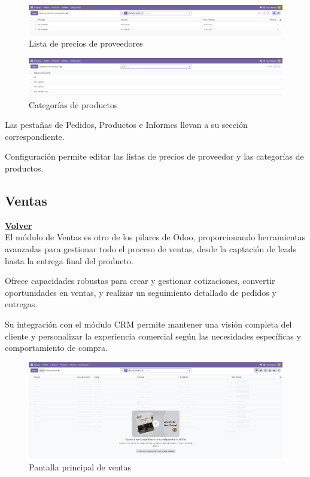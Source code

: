 \documentclass[a4paper,12pt]{article}
\begin{document}
\begin{figure}[h!]
    \centering
    \includegraphics[width=1\textwidth]{pr2odoo38-preciosProveedor.png}
    \caption{Lista de precios de proveedores}
\end{figure}
\FloatBarrier

\begin{figure}[h!]
    \centering
    \includegraphics[width=1\textwidth]{pr2odoo39-categoriasPrioductos.png}
    \caption{Categorías de productos}
\end{figure}
\FloatBarrier

Las pestañas de Pedidos, Productos e Informes llevan a su sección correspondiente.

Configuración permite editar las listas de precios de proveedor y las categorías de productos.

\clearpage

\subsection{Ventas}
\hyperlink{anchor-indice}{\textbf{Volver}}\\

El módulo de Ventas es otro de los pilares de Odoo, proporcionando herramientas avanzadas para gestionar todo el proceso de ventas, desde la captación de leads hasta la entrega final del producto.

Ofrece capacidades robustas para crear y gestionar cotizaciones, convertir oportunidades en ventas, y realizar un seguimiento detallado de pedidos y entregas.

Su integración con el módulo CRM permite mantener una visión completa del cliente y personalizar la experiencia comercial según las necesidades específicas y comportamiento de compra.

\begin{figure}[h!]
    \centering
    \includegraphics[width=1\textwidth]{pr2odoo40-pantallaPrincipalVentas.png}
    \caption{Pantalla principal de ventas}
\end{figure}
\FloatBarrier
\end{document}
